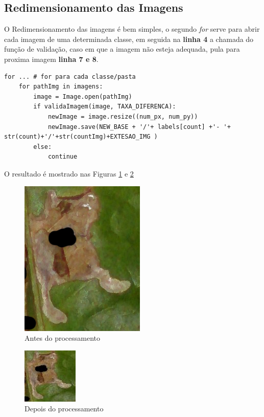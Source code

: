 \documentclass{article}
\begin{document}
\subsection{Redimensionamento das Imagens}

O Redimensionamento das imagens é bem simples, o segundo \textit{for} serve para abrir cada imagem de uma determinada classe, em seguida na \textbf{linha 4} a chamada do função de validação, caso em que a imagem não esteja adequada, pula para proxima imagem \textbf{linha 7 e 8}.
\begin{lstlisting}
for ... # for para cada classe/pasta
    for pathImg in imagens:
        image = Image.open(pathImg)
        if validaImagem(image, TAXA_DIFERENCA):
            newImage = image.resize((num_px, num_py))
            newImage.save(NEW_BASE + '/'+ labels[count] +'- '+ str(count)+'/'+str(countImg)+EXTESAO_IMG )
        else:
            continue
\end{lstlisting}

O resultado é mostrado nas Figuras \ref{fig:antes} e \ref{fig:depois}

\begin{figure}[ht!]
\centering
\includegraphics[scale=0.8]{img/antes.jpg}
\caption{Antes do processamento}
\label{fig:antes}
\end{figure}

\begin{figure}[ht!]
\centering
\includegraphics[scale=1]{img/depois.jpg}
\caption{Depois do processamento}
\label{fig:depois}
\end{figure}




\end{document}
